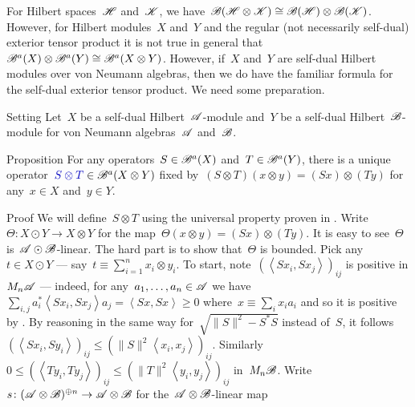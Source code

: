 \begin{parsec}%
\begin{point}%
For Hilbert spaces~$\mathscr{H}$ and~$\mathscr{K}$,
    we have~$\mathscr{B}(\mathscr{H} \otimes \mathscr{K})
        \cong \mathscr{B}(\mathscr{H}) \otimes \mathscr{B}(\mathscr{K})$.
However, for Hilbert modules~$X$ and~$Y$
    and the regular (not necessarily self-dual)
        exterior tensor product
        it is not true in general
        that~$\mathscr{B}^a(X) \otimes \mathscr{B}^a(Y) \cong \mathscr{B}^a(X \otimes Y)$.
However, if~$X$ and~$Y$ are self-dual Hilbert modules over von Neumann
    algebras, then we do have the familiar formula
    for the self-dual exterior tensor product.
We need some preparation.
\end{point}
\begin{point}{Setting}%
Let~$X$ be a self-dual Hilbert~$\mathscr{A}$-module
    and~$Y$ be a self-dual Hilbert~$\mathscr{B}$-module
    for von Neumann algebras~$\mathscr{A}$ and~$\mathscr{B}$.
\end{point}
\begin{point}{Proposition}%
For any operators~$S \in \mathscr{B}^a(X)$ and~$T \in \mathscr{B}^a(Y)$,
there is a unique operator~$\Define{S \otimes T} \in \scrB^a(X\otimes Y)$%
    fixed by~$(S \otimes T) (x \otimes y) = (S x) \otimes (T y)$
    for any~$x\in X$ and~$y \in Y$.
\begin{point}{Proof}%
We will define~$S \otimes T$ using the universal
    property proven in .
Write~$\Theta \colon X \odot Y \to X \otimes Y$
    for the map~$\Theta(x \otimes y) = (Sx) \otimes (Ty)$.
It is easy to see~$\Theta$ is~$\mathscr{A} \odot \mathscr{B}$-linear.
The hard part is to show that~$\Theta$ is bounded.
Pick any~$t \in X \odot Y$ --- say~$t \equiv \sum^n_{i=1} x_i \otimes y_i$.
To start, note~$(\left<Sx_i, Sx_j\right>)_{ij}$ is positive in $M_n \mathscr{A}$ ---
    indeed, for any~$a_1, \ldots, a_n \in \mathscr{A}$
    we have~$\sum_{i,j} a_i^* \left<S x_i, S x_j\right> a_j
            = \left<Sx,Sx\right> \geq 0$
                where~$x \equiv \sum_i x_i a_i$
                and so it is positive
                by .
By reasoning in the same way for~$\sqrt{\|S\|^2 - S^*S}$
instead of~$S$,
it follows~$(\left<Sx_i, Sy_i \right>)_{ij} \leq (\|S\|^2 \left<x_i,x_j\right>)_{ij}$.
Similarly~$0 \leq (\left<Ty_i, Ty_j\right>)_{ij} \leq (\|T\|^2 \left<y_i, y_j\right>)_{ij}$ in~$M_n \mathscr{B}$.
Write~$s\colon (\mathscr{A} \otimes \mathscr{B})^{\oplus n} \to \mathscr{A} \otimes \mathscr{B}$
    for the~$\mathscr{A} \otimes \mathscr{B}$-linear map

\end{point}
\end{point}
\end{parsec}
